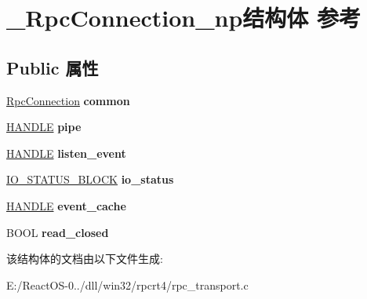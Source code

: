 \hypertarget{struct___rpc_connection__np}{}\section{\+\_\+\+Rpc\+Connection\+\_\+np结构体 参考}
\label{struct___rpc_connection__np}
\subsection*{Public 属性}
\begin{DoxyCompactItemize}
\item 
\mbox{\label{struct___rpc_connection__np_aff080802ffe53dd2d1e9303f86ec8695}} 
\hyperlink{struct___rpc_connection}{Rpc\+Connection} {\bfseries common}
\item 
\mbox{\label{struct___rpc_connection__np_afeccfb122614bfde07314967c8950f7b}} 
\hyperlink{interfacevoid}{H\+A\+N\+D\+LE} {\bfseries pipe}
\item 
\mbox{\label{struct___rpc_connection__np_a6031edfb914711259281d3cfb38390ee}} 
\hyperlink{interfacevoid}{H\+A\+N\+D\+LE} {\bfseries listen\+\_\+event}
\item 
\mbox{\label{struct___rpc_connection__np_aa82a6e1c45a8b25692c5220ff5b4011d}} 
\hyperlink{struct___i_o___s_t_a_t_u_s___b_l_o_c_k}{I\+O\+\_\+\+S\+T\+A\+T\+U\+S\+\_\+\+B\+L\+O\+CK} {\bfseries io\+\_\+status}
\item 
\mbox{\label{struct___rpc_connection__np_ae4956507082aacae5b28115b54e6cc03}} 
\hyperlink{interfacevoid}{H\+A\+N\+D\+LE} {\bfseries event\+\_\+cache}
\item 
\mbox{\label{struct___rpc_connection__np_ac6289a2f90f1bea79f702228458092db}} 
B\+O\+OL {\bfseries read\+\_\+closed}
\end{DoxyCompactItemize}


该结构体的文档由以下文件生成\+:\begin{DoxyCompactItemize}
\item 
E\+:/\+React\+O\+S-\/0../dll/win32/rpcrt4/rpc\+\_\+transport.\+c\end{DoxyCompactItemize}
